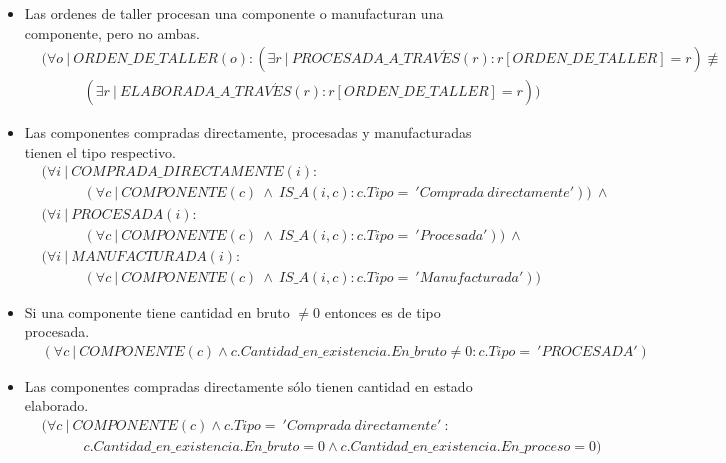 \documentclass[]{report}
\begin{document}
\begin{itemize}
		\item Las ordenes de taller procesan una componente o manufacturan una componente, pero no ambas.
		\begin{align*}
		&(\forall o\ |\ ORDEN\_DE\_TALLER(o) : (\exists r\ |\ PROCESADA\_A\_TRAV\acute{E}S(r) : r[ORDEN\_DE\_TALLER]=r) \not \equiv \\
		& \hspace{3em} (\exists r\ |\ ELABORADA\_A\_TRAV\acute{E}S(r) : r[ORDEN\_DE\_TALLER]=r))
		\end{align*}
		
		\item Las componentes compradas directamente, procesadas y manufacturadas tienen el tipo respectivo.
		\begin{align*}
		&(\forall i\ |\ COMPRADA\_DIRECTAMENTE(i) :\\
		&\hspace{3em} (\forall c\ |\ COMPONENTE(c)\ \land\ IS\_A(i,c) : c.Tipo =\ 'Comprada\ directamente'))\ \land \\
		&(\forall i\ |\ PROCESADA(i) :\\
		&\hspace{3em}(\forall c\ |\ COMPONENTE(c)\ \land\ IS\_A(i,c) : c.Tipo =\ 'Procesada'))\ \land \\
		&(\forall i\ |\ MANUFACTURADA(i) :\\
		&\hspace{3em}(\forall c\ |\ COMPONENTE(c)\ \land\ IS\_A(i,c) : c.Tipo =\ 'Manufacturada'))
		\end{align*}
		
		\item Si una componente tiene cantidad en bruto $\not = 0$ entonces es de tipo procesada.
		\begin{align*}
		&(\forall c\ |\ COMPONENTE(c) \land c.Cantidad\_en\_existencia.En\_bruto \not = 0 : c.Tipo =\ 'PROCESADA')
		\end{align*}
		
		\item Las componentes compradas directamente sólo tienen cantidad en estado elaborado.
		\begin{align*}
		&(\forall c\ |\ COMPONENTE(c) \land c.Tipo =\ 'Comprada\ directamente'\ : \\
		& \hspace{3em}c.Cantidad\_en\_existencia.En\_bruto = 0 \land c.Cantidad\_en\_existencia.En\_proceso = 0)
		\end{align*}
		

\end{itemize}
\end{document}
